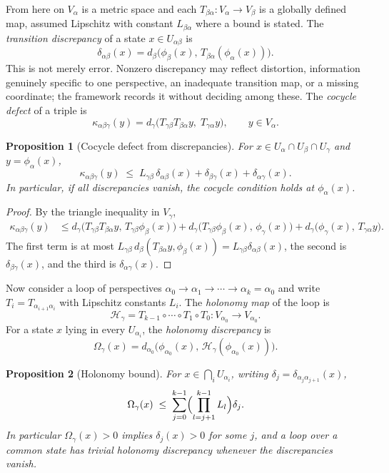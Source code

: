 \documentclass[11pt]{article}
\newtheorem{proposition}{Proposition}
\theoremstyle{remark}
\begin{document}
From here on $V_\alpha$ is a metric space and each $T_{\beta\alpha}:V_\alpha\to V_\beta$ is a globally defined map, assumed Lipschitz with constant $L_{\beta\alpha}$ where a bound is stated. The \emph{transition discrepancy} of a state $x\in U_{\alpha\beta}$ is
\[
\delta_{\alpha\beta}(x)=d_\beta\bigl(\phi_\beta(x),\,T_{\beta\alpha}(\phi_\alpha(x))\bigr).
\]
This is not merely error. Nonzero discrepancy may reflect distortion, information genuinely specific to one perspective, an inadequate transition map, or a missing coordinate; the framework records it without deciding among these. The \emph{cocycle defect} of a triple is
\[
\kappa_{\alpha\beta\gamma}(y)=d_\gamma\bigl(T_{\gamma\beta}T_{\beta\alpha}y,\;T_{\gamma\alpha}y\bigr),\qquad y\in V_\alpha .
\]

\begin{proposition}[Cocycle defect from discrepancies]
For $x\in U_\alpha\cap U_\beta\cap U_\gamma$ and $y=\phi_\alpha(x)$,
\[
\kappa_{\alpha\beta\gamma}(y)\;\le\;L_{\gamma\beta}\,\delta_{\alpha\beta}(x)+\delta_{\beta\gamma}(x)+\delta_{\alpha\gamma}(x).
\]
In particular, if all discrepancies vanish, the cocycle condition holds at $\phi_\alpha(x)$.
\end{proposition}

\begin{proof}
By the triangle inequality in $V_\gamma$,
\begin{align*}
\kappa_{\alpha\beta\gamma}(y)
&\le d_\gamma\bigl(T_{\gamma\beta}T_{\beta\alpha}y,\,T_{\gamma\beta}\phi_\beta(x)\bigr)
+d_\gamma\bigl(T_{\gamma\beta}\phi_\beta(x),\,\phi_\gamma(x)\bigr)
+d_\gamma\bigl(\phi_\gamma(x),\,T_{\gamma\alpha}y\bigr).
\end{align*}
The first term is at most $L_{\gamma\beta}\,d_\beta(T_{\beta\alpha}y,\phi_\beta(x))=L_{\gamma\beta}\delta_{\alpha\beta}(x)$, the second is $\delta_{\beta\gamma}(x)$, and the third is $\delta_{\alpha\gamma}(x)$.
\end{proof}

Now consider a loop of perspectives $\alpha_0\to\alpha_1\to\cdots\to\alpha_k=\alpha_0$ and write $T_i=T_{\alpha_{i+1}\alpha_i}$ with Lipschitz constants $L_i$. The \emph{holonomy map} of the loop is
\[
\mathcal H_\gamma=T_{k-1}\circ\cdots\circ T_1\circ T_0:V_{\alpha_0}\to V_{\alpha_0}.
\]
For a state $x$ lying in every $U_{\alpha_i}$, the \emph{holonomy discrepancy} is
\[
\Omega_\gamma(x)=d_{\alpha_0}\bigl(\phi_{\alpha_0}(x),\,\mathcal H_\gamma(\phi_{\alpha_0}(x))\bigr).
\]

\begin{proposition}[Holonomy bound]
For $x\in\bigcap_{i}U_{\alpha_i}$, writing $\delta_j=\delta_{\alpha_j\alpha_{j+1}}(x)$,
\[
\Omega_\gamma(x)\;\le\;\sum_{j=0}^{k-1}\Bigl(\prod_{l=j+1}^{k-1}L_l\Bigr)\delta_j .
\]
In particular $\Omega_\gamma(x)>0$ implies $\delta_j(x)>0$ for some $j$, and a loop over a common state has trivial holonomy discrepancy whenever the discrepancies vanish.
\end{proposition}
\end{document}
